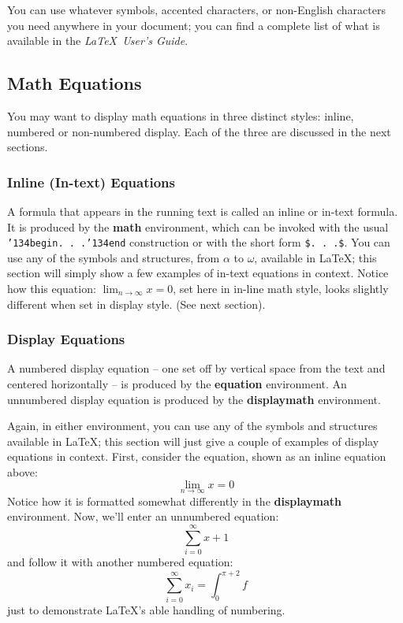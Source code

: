 \documentclass{sig-alternate2-pods09}
\begin{document}
You can use whatever symbols, accented characters, or
non-English characters you need anywhere in your document;
you can find a complete list of what is
available in the \textit{\LaTeX\
User's Guide}\cite{Lamport:LaTeX}.

\subsection{Math Equations}
You may want to display math equations in three distinct styles:
inline, numbered or non-numbered display.  Each of
the three are discussed in the next sections.

\subsubsection{Inline (In-text) Equations}
A formula that appears in the running text is called an
inline or in-text formula.  It is produced by the
\textbf{math} environment, which can be
invoked with the usual \texttt{{\char'134}begin. . .{\char'134}end}
construction or with the short form \texttt{\$. . .\$}. You
can use any of the symbols and structures,
from $\alpha$ to $\omega$, available in
\LaTeX\cite{Lamport:LaTeX}; this section will simply show a
few examples of in-text equations in context. Notice how
this equation: \begin{math}\lim_{n\rightarrow \infty}x=0\end{math},
set here in in-line math style, looks slightly different when
set in display style.  (See next section).

\subsubsection{Display Equations}
A numbered display equation -- one set off by vertical space
from the text and centered horizontally -- is produced
by the \textbf{equation} environment. An unnumbered display
equation is produced by the \textbf{displaymath} environment.

Again, in either environment, you can use any of the symbols
and structures available in \LaTeX; this section will just
give a couple of examples of display equations in context.
First, consider the equation, shown as an inline equation above:
\begin{equation}\lim_{n\rightarrow \infty}x=0\end{equation}
Notice how it is formatted somewhat differently in
the \textbf{displaymath}
environment.  Now, we'll enter an unnumbered equation:
\begin{displaymath}\sum_{i=0}^{\infty} x + 1\end{displaymath}
and follow it with another numbered equation:
\begin{equation}\sum_{i=0}^{\infty}x_i=\int_{0}^{\pi+2} f\end{equation}
just to demonstrate \LaTeX's able handling of numbering.
\end{document}
